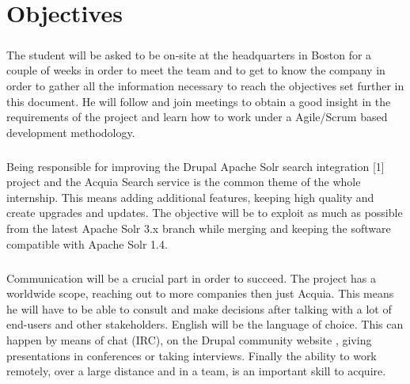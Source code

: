 \chapter{Objectives}
\paragraph{}
The student will be asked to be on-site at the headquarters in Boston for a couple of weeks in order to meet the team and to get to know the company in order to gather all the information necessary to reach the objectives set further in this document. He will follow and join meetings to obtain a good insight in the requirements of the project and learn how to work under a Agile/Scrum based development methodology.

\paragraph{}
Being responsible for improving the Drupal Apache Solr search integration [1] project and the Acquia Search service is the common theme of the whole internship. This means adding additional features, keeping high quality and create upgrades and updates. The objective will be to exploit as much as possible from the latest Apache Solr 3.x branch while merging and keeping the software compatible with Apache Solr 1.4.

\paragraph{}
Communication will be a crucial part in order to succeed. The project has a worldwide scope, reaching out to more companies then just Acquia. This means he will have to be able to consult and make decisions after talking with a lot of end-users and other stakeholders. English will be the language of choice. This can happen by means of chat (IRC), on the Drupal community website \cite{drupal_site}, giving presentations in conferences or taking interviews.
Finally the ability to work remotely, over a large distance and in a team, is an important skill to acquire.

